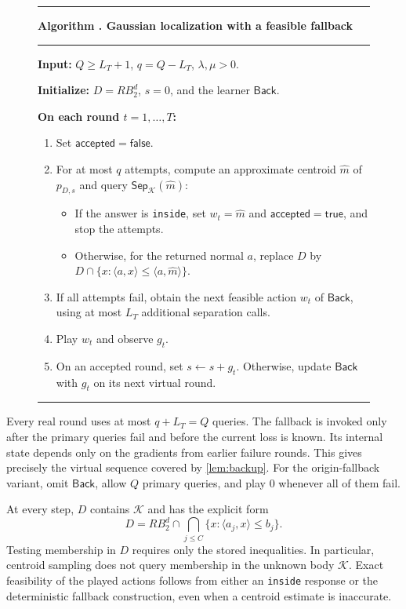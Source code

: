 \documentclass[11pt]{article}
\newcommand{\K}{\mathcal K}
\newcommand{\Sep}{\mathsf{Sep}}
\newcommand{\Back}{\mathsf{Back}}
\newcommand{\ip}[2]{\langle #1,#2\rangle}
\theoremstyle{definition}
\newcounter{algorithm}
\begin{document}
\begin{figure}[t]
\hrule\smallskip
{}\label{alg:hybrid}
\noindent\textbf{Algorithm \thealgorithm. Gaussian localization with a feasible fallback}
\smallskip\hrule\medskip
\small
\noindent\textbf{Input:} $Q\ge L_T+1$, $q=Q-L_T$, $\lambda,\mu>0$.
\par\smallskip
\noindent\textbf{Initialize:} $D=RB_2^d$, $s=0$, and the learner $\Back$.
\par\smallskip
\noindent\textbf{On each round $t=1,\ldots,T$:}
\begin{enumerate}[label=\arabic*.,leftmargin=1.7em,itemsep=3pt,topsep=4pt]
 \item Set $\mathsf{accepted}=\mathsf{false}$.
 \item For at most $q$ attempts, compute an approximate centroid $\widehat m$
 of $p_{D,s}$ and query $\Sep_\K(\widehat m)$:
 \begin{itemize}[leftmargin=1.4em,itemsep=2pt,topsep=2pt]
  \item If the answer is \texttt{inside}, set $w_t=\widehat m$ and
  $\mathsf{accepted}=\mathsf{true}$, and stop the attempts.
  \item Otherwise, for the returned normal $a$, replace $D$ by
  $D\cap\{x:\ip{a}{x}\le\ip{a}{\widehat m}\}$.
 \end{itemize}
 \item If all attempts fail, obtain the next feasible action $w_t$ of
 $\Back$, using at most $L_T$ additional separation calls.
 \item Play $w_t$ and observe $g_t$.
 \item On an accepted round, set $s\gets s+g_t$. Otherwise, update $\Back$
 with $g_t$ on its next virtual round.
\end{enumerate}
\smallskip\hrule
\end{figure}

Every real round uses at most $q+L_T=Q$ queries. The fallback is invoked
only after the primary queries fail and before the current loss is known.
Its internal state depends only on the gradients from earlier failure
rounds. This gives precisely the virtual sequence covered by
\cref{lem:backup}. For the origin-fallback variant, omit $\Back$, allow
$Q$ primary queries, and play $0$ whenever all of them fail.

At every step, $D$ contains $\K$ and has the explicit form
\[
 D=RB_2^d\cap\bigcap_{j\le C}\{x:\ip{a_j}{x}\le b_j\}.
\]
Testing membership in $D$ requires only the stored inequalities.
In particular, centroid sampling does not query membership in the unknown
body $\K$. Exact feasibility of the played actions follows from either an
\texttt{inside} response or the deterministic fallback construction, even
when a centroid estimate is inaccurate.
\end{document}
